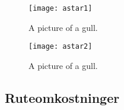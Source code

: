 \begin{figure}[h]
  	\centering
    \texttt{[image: astar1]}
	\caption{A picture of a gull.}
\end{figure}

\begin{figure}[h]
  	\centering
    \texttt{[image: astar2]}
	\caption{A picture of a gull.}
\end{figure}

\subsection{Ruteomkostninger}
\label{subsec:ruteomkostninger}
